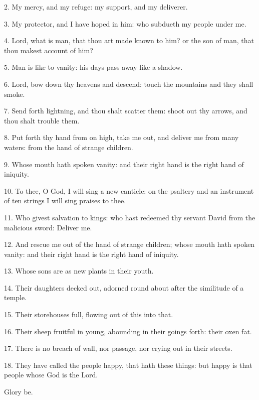  
 2. My mercy, and my refuge: my support, and my deliverer.
 
 3. My protector, and I have hoped in him: who subdueth my people under me. 
 
 4. Lord, what is man, that thou art made known to him? or the son of man, that thou makest account of him? 
 
 5. Man is like to vanity: his days pass away like a shadow. 
 
 6. Lord, bow down thy heavens and descend: touch the mountains and they shall smoke.

7. Send forth lightning, and thou shalt scatter them:
shoot out thy arrows, and thou shalt trouble them.

8. Put forth thy hand from on high, take me out, and deliver me from many waters:
from the hand of strange children. 

9. Whose mouth hath spoken vanity: and their right hand is the right hand of iniquity. 

10. To thee, O God, I will sing a new canticle: on the psaltery and an instrument of ten strings I will sing praises to thee. 

11. Who givest salvation to kings: who hast redeemed thy servant David from the malicious sword: Deliver me.

12. And rescue me out of the hand of strange children; whose mouth hath spoken vanity:
and their right hand is the right hand of iniquity.

 13. Whose sons are as new plants in their youth.
 
 14. Their daughters decked out, adorned round about after the similitude of a temple. 
 
 15. Their storehouses full, flowing out of this into that.
 
 16. Their sheep fruitful in young, abounding in their goings forth: their oxen fat.
 
 17. There is no breach of wall, nor passage, nor crying out in their streets. 
 
 18. They have called the people happy, that hath these things: but happy is that people whose God is the Lord. 

Glory be.